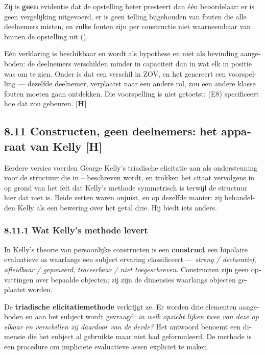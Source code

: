 \begin{dutch}
Zij is \textbf{geen} evidentie dat de opstelling beter presteert dan één beoordelaar: er is geen vergelijking uitgevoerd, er is geen telling bijgehouden van fouten die alle deelnemers misten, en zulke fouten zijn per constructie niet waarneembaar van binnen de opstelling uit ().

Eén verklaring is beschikbaar en wordt als hypothese en niet als bevinding aangeboden: de deelnemers verschilden minder in capaciteit dan in wat elk in positie was om te zien. Onder  is dat een verschil in ZOV, en het genereert een voorspelling — dezelfde deelnemer, verplaatst naar een andere rol, zou een andere klasse fouten moeten gaan ontdekken. Die voorspelling is niet getoetst;  (E8) specificeert hoe dat zou gebeuren. \textbf{[H]}


\subsection*{8.11 Constructen, geen deelnemers: het apparaat van Kelly \textbf{[H]}}
\label{sec:nl:8.11}

Eerdere versies voerden George Kelly's triadische elicitatie aan als ondersteuning voor de structuur die in – beschreven wordt, en trokken het citaat vervolgens in op grond van het feit dat Kelly's methode symmetrisch is terwijl de structuur hier dat niet is. Beide zetten waren onjuist, en op dezelfde manier: zij behandelden Kelly als een bewering over het getal drie. Hij biedt iets anders.


\subsubsection*{8.11.1 Wat Kelly's methode levert}
\label{sec:nl:8.11.1}

In Kelly's theorie van persoonlijke constructen is een \textbf{construct} een bipolaire evaluatieve as waarlangs een subject ervaring classificeert — \emph{streng / declaratief}, \emph{afleidbaar / geponeerd}, \emph{traceerbaar / niet toegeschreven}. Constructen zijn geen opvattingen over bepaalde objecten; zij zijn de dimensies waarlangs objecten geplaatst worden.

De \textbf{triadische elicitatiemethode} verkrijgt ze. Er worden drie elementen aangeboden en aan het subject wordt gevraagd: \emph{in welk opzicht lijken twee van deze op elkaar en verschillen zij daardoor van de derde?} Het antwoord benoemt een dimensie die het subject al gebruikte maar niet had geformuleerd. De methode is een procedure om impliciete evaluatieve assen expliciet te maken.


\end{dutch}
